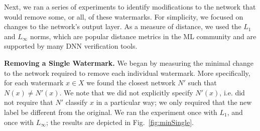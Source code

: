 \documentclass{easychair}
\begin{document}
Next, we ran a series of experiments to identify modifications to the
network that would remove some, or all, of these watermarks. For
simplicity, we
focused on changes to the network's output layer. As a measure of
distance, we used the $L_1$ and $L_\infty$ norms, which are popular
distance metrics in the ML community and are supported by many DNN
verification tools.

\medskip\noindent \textbf{Removing a Single Watermark.}
We began by measuring the minimal change to the network required to
remove each individual watermark. More specifically, for each
watermark $x\in X$ we found the closest network $N'$ such that
$N(x)\neq N'(x)$. We note that we did not explicitly specify $N'(x)$,
i.e. did not require that $N'$ classify $x$ in a particular way; we
only required that the new label be different from the original. We
ran the experiment once with $L_1$, and once with $L_\infty$; the
results are depicted in Fig.~\ref{fig:minSingle}.
\end{document}
